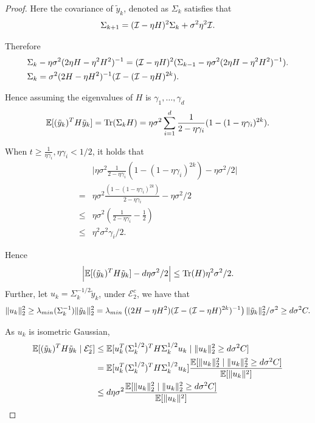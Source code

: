 \begin{proof}
    Here the covariance of $\tilde y_k$, denoted as $\Sigma_k$ satisfies that
    \begin{align*}
        \Sigma_{k + 1} = (\mathcal{I} - \eta H)^2 \Sigma_{k} + \sigma^2 \eta^2 \mathcal{I}.
    \end{align*}

    Therefore 
    \begin{align*}
        &\Sigma_k - \eta \sigma^2 (2 \eta H - \eta^2 H^2)^{-1}  = (\mathcal{I} - \eta H)^2 (\Sigma_{k - 1} - \eta \sigma^2 (2 \eta H - \eta^2 H^2)^{-1}). \\
        &\Sigma_k = \sigma^2 (2H - \eta H^2)^{-1} (\mathcal{I} - (\mathcal{I} - \eta H)^{2k}).
    \end{align*}

    Hence assuming the eigenvalues of $H$ is $\gamma_1, \dots, \gamma_d$
    \begin{align*}
        \mathbb{E}[(\tilde y_k)^T H \tilde y_k] = \mathrm{Tr}(\Sigma_k H) = \eta \sigma^2 \sum_{i = 1}^d \frac{1}{2 - \eta \gamma_i } (1 - (1 - \eta \gamma_i)^{2k}).
    \end{align*}

    When $t \ge \frac{1}{\eta\gamma_i}, \eta \gamma_i < 1/2$, it holds that
    \begin{align*}
        &\Big|  \eta \sigma^2 \frac{1}{2 - \eta \gamma_i} (1 - (1 - \eta \gamma_i)^{2k}) - \eta \sigma^2 /2 \Big | \\
        =& \eta \sigma^2 \frac{(1 - (1 - \eta \gamma_i)^{2k})}{2 - \eta \gamma_i} - \eta \sigma^2 /2 \\
        \le& \eta \sigma^2 \left( \frac{1}{2 - \eta \gamma_i} - \frac{1}{2} \right) \\
        \le& \eta^2 \sigma^2 \gamma_i / 2.
    \end{align*}

    Hence 
    \begin{align*}
        \Big | \mathbb{E}[(\tilde y_k)^T H \tilde y_k] - d \eta \sigma^2 / 2 \Big | \le \mathrm{Tr}(H)\eta^2 \sigma^2 / 2.
    \end{align*}
    Further, let $u_k = \Sigma_k^{-1/2} \tilde y_k$, under $\mathcal{E}_2^c$, we have that
    \begin{align*}
        \| u_k \|_2^2 \ge \lambda_{min}(\Sigma_k^{-1}) \| \tilde y_k \|_2^2 = \lambda_{min}\left( (2H - \eta H^2) (\mathcal{I} - (\mathcal{I} - \eta H)^{2k})^{-1}  \right) \| \tilde y_k \|_2^2 / \sigma^2 \ge d \sigma^2 C.
    \end{align*}

    As $u_k$ is isometric Gaussian,
    \begin{align*}
        \mathbb{E}[(\tilde y_k)^T H \tilde y_k \mid \mathcal{E}_2^c] &\le \mathbb{E}[u_k^T (\Sigma_k^{1/2})^T H \Sigma_k^{1/2} u_k \mid \| u_k \|_2^2 \ge d \sigma^2 C] \\
        &= \mathbb{E}[u_k^T (\Sigma_k^{1/2})^T H \Sigma_k^{1/2} u_k] \frac{\mathbb{E}[\|u_k\|_2^2 \mid \| u_k \|_2^2 \ge d \sigma^2 C]}{\mathbb{E}[\|u_k\|^2]} \\
        &\le d \eta \sigma^2 \frac{\mathbb{E}[\|u_k\|_2^2 \mid \| u_k \|_2^2 \ge d \sigma^2 C]}{\mathbb{E}[\|u_k\|^2]}  \end{align*}


\end{proof}
